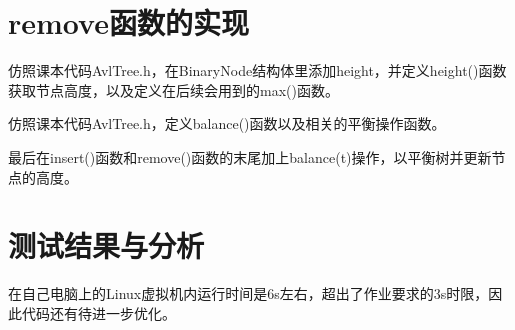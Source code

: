 \documentclass[UTF8]{ctexart}
\begin{document}
\pagestyle{fancy}
\fancyhead{}

\section{remove函数的实现}

仿照课本代码AvlTree.h，在BinaryNode结构体里添加height，并定义height()函数获取节点高度，以及定义在后续会用到的max()函数。

仿照课本代码AvlTree.h，定义balance()函数以及相关的平衡操作函数。

最后在insert()函数和remove()函数的末尾加上balance(t)操作，以平衡树并更新节点的高度。

\section{测试结果与分析}

在自己电脑上的Linux虚拟机内运行时间是6s左右，超出了作业要求的3s时限，因此代码还有待进一步优化。
\end{document}

